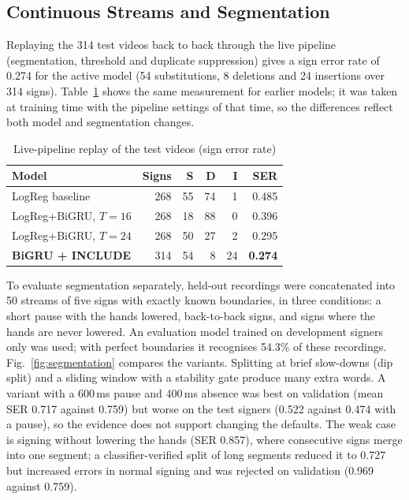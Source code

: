 \documentclass[conference]{IEEEtran}
\begin{document}
\subsection{Continuous Streams and Segmentation}
Replaying the 314 test videos back to back through the live pipeline (segmentation, threshold and duplicate suppression) gives a sign error rate of 0.274 for the active model (54 substitutions, 8 deletions and 24 insertions over 314 signs). Table~\ref{tab:stream} shows the same measurement for earlier models; it was taken at training time with the pipeline settings of that time, so the differences reflect both model and segmentation changes.

\begin{table}[t]
\caption{Live-pipeline replay of the test videos (sign error rate)}
\label{tab:stream}
\centering
\setlength{\tabcolsep}{4pt}
\begin{tabular}{@{}lrrrrr@{}}
\toprule
Model & Signs & S & D & I & SER \\
\midrule
LogReg baseline & 268 & 55 & 74 & 1 & 0.485 \\
LogReg+BiGRU, $T{=}16$ & 268 & 18 & 88 & 0 & 0.396 \\
LogReg+BiGRU, $T{=}24$ & 268 & 50 & 27 & 2 & 0.295 \\
\textbf{BiGRU + INCLUDE} & 314 & 54 & 8 & 24 & \textbf{0.274} \\
\bottomrule
\end{tabular}
\end{table}

To evaluate segmentation separately, held-out recordings were concatenated into 50 streams of five signs with exactly known boundaries, in three conditions: a short pause with the hands lowered, back-to-back signs, and signs where the hands are never lowered. An evaluation model trained on development signers only was used; with perfect boundaries it recognises 54.3\% of these recordings. Fig.~\ref{fig:segmentation} compares the variants. Splitting at brief slow-downs (dip split) and a sliding window with a stability gate produce many extra words. A variant with a 600\,ms pause and 400\,ms absence was best on validation (mean SER 0.717 against 0.759) but worse on the test signers (0.522 against 0.474 with a pause), so the evidence does not support changing the defaults. The weak case is signing without lowering the hands (SER 0.857), where consecutive signs merge into one segment; a classifier-verified split of long segments reduced it to 0.727 but increased errors in normal signing and was rejected on validation (0.969 against 0.759).
\end{document}
